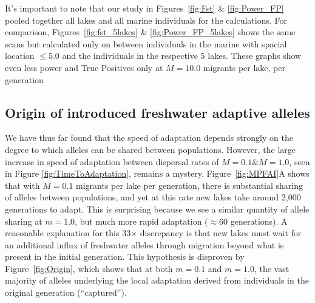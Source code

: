\documentclass{article}
\begin{document}
It's important to note that our study in Figures~\ref{fig:Fst} \& \ref{fig:Power_FP} pooled together all lakes and all marine individuals for the calculations. 
For comparison, Figures~\ref{fig:fst_5lakes} \& \ref{fig:Power_FP_5lakes} shows the same scans but calculated 
only on between individuals in the marine with spacial location $\le 5.0$ and the individuals in the respective 5 lakes.
These graphs show even less power and True Positives only at $ M = 10.0$ migrants per lake, per generation



\subsection*{Origin of introduced freshwater adaptive alleles}

We have thus far found that the speed of adaptation depends strongly
on the degree to which alleles can be shared between populations.
However, the large increase in speed of adaptation between dispersal rates of $M = 0.1 \& M = 1.0$, seen in Figure \ref{fig:TimeToAdaptation}, remains a mystery. 
Figure~\ref{fig:MPFAI}A shows that with $M = 0.1$ migrants per lake per generation, 
there is substantial sharing of alleles between populations,
and yet at this rate new lakes take around 2,000 generations to adapt.
This is surprising because we see a similar quantity of allele sharing at  $m = 1.0$, 
but much more rapid adaptation ($\approx 60$ generations). 
A reasonable explanation for this 33$\times$ discrepancy is that 
new lakes must wait for an additional influx of freshwater alleles through migration
beyond what is present in the initial generation.
This hypothesis is disproven by
Figure~\ref{fig:Origin}, which shows that at both $m = 0.1$ and $m = 1.0$,
the vast majority of alleles underlying the local adaptation
derived from individuals in the original generation (``captured'').
\end{document}
